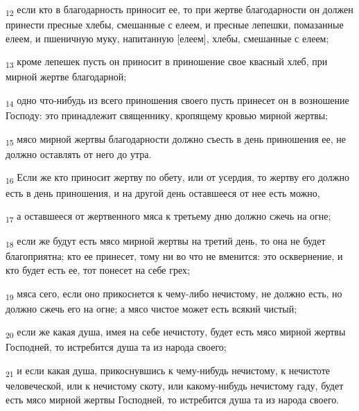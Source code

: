\begin{tcolorbox}
\textsubscript{12} если кто в благодарность приносит ее, то при жертве благодарности он должен принести пресные хлебы, смешанные с елеем, и пресные лепешки, помазанные елеем, и пшеничную муку, напитанную [елеем], хлебы, смешанные с елеем;
\end{tcolorbox}
\begin{tcolorbox}
\textsubscript{13} кроме лепешек пусть он приносит в приношение свое квасный хлеб, при мирной жертве благодарной;
\end{tcolorbox}
\begin{tcolorbox}
\textsubscript{14} одно что-нибудь из всего приношения своего пусть принесет он в возношение Господу: это принадлежит священнику, кропящему кровью мирной жертвы;
\end{tcolorbox}
\begin{tcolorbox}
\textsubscript{15} мясо мирной жертвы благодарности должно съесть в день приношения ее, не должно оставлять от него до утра.
\end{tcolorbox}
\begin{tcolorbox}
\textsubscript{16} Если же кто приносит жертву по обету, или от усердия, то жертву его должно есть в день приношения, и на другой день оставшееся от нее есть можно,
\end{tcolorbox}
\begin{tcolorbox}
\textsubscript{17} а оставшееся от жертвенного мяса к третьему дню должно сжечь на огне;
\end{tcolorbox}
\begin{tcolorbox}
\textsubscript{18} если же будут есть мясо мирной жертвы на третий день, то она не будет благоприятна; кто ее принесет, тому ни во что не вменится: это осквернение, и кто будет есть ее, тот понесет на себе грех;
\end{tcolorbox}
\begin{tcolorbox}
\textsubscript{19} мяса сего, если оно прикоснется к чему-либо нечистому, не должно есть, но должно сжечь его на огне; а мясо чистое может есть всякий чистый;
\end{tcolorbox}
\begin{tcolorbox}
\textsubscript{20} если же какая душа, имея на себе нечистоту, будет есть мясо мирной жертвы Господней, то истребится душа та из народа своего;
\end{tcolorbox}
\begin{tcolorbox}
\textsubscript{21} и если какая душа, прикоснувшись к чему-нибудь нечистому, к нечистоте человеческой, или к нечистому скоту, или какому-нибудь нечистому гаду, будет есть мясо мирной жертвы Господней, то истребится душа та из народа своего.
\end{tcolorbox}
